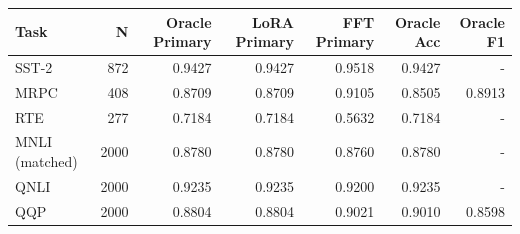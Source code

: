 \begin{tabular}{lrrrrrr}
\toprule
Task & N & Oracle Primary & LoRA Primary & FFT Primary & Oracle Acc & Oracle F1 \\
\midrule
SST-2 & 872 & 0.9427 & 0.9427 & 0.9518 & 0.9427 & - \\
MRPC & 408 & 0.8709 & 0.8709 & 0.9105 & 0.8505 & 0.8913 \\
RTE & 277 & 0.7184 & 0.7184 & 0.5632 & 0.7184 & - \\
MNLI (matched) & 2000 & 0.8780 & 0.8780 & 0.8760 & 0.8780 & - \\
QNLI & 2000 & 0.9235 & 0.9235 & 0.9200 & 0.9235 & - \\
QQP & 2000 & 0.8804 & 0.8804 & 0.9021 & 0.9010 & 0.8598 \\
\bottomrule
\end{tabular}
